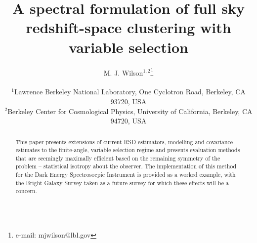 \documentclass[useAMS,usenatbib]{mn2e}
\title[Spectral RSD as an isotropic observable]{A spectral formulation of full sky redshift-space clustering with variable selection}
\author[M. J. Wilson]
{M. J. Wilson$^{1,2}$\thanks{e-mail: mjwilson@lbl.gov}
 \\~\\
\footnotesize
\footnotesize
$^1$Lawrence Berkeley National Laboratory, One Cyclotron Road, Berkeley, CA 93720, USA\\
$^2$Berkeley Center for Cosmological Physics, University of California, Berkeley, CA 94720, USA\\
}
\begin{document}
\maketitle 

\begin{abstract}
This paper presents extensions of current RSD estimators, modelling and covariance estimates to the finite-angle, variable selection regime and presents evaluation methods that are seemingly maximally efficient based on the remaining symmetry of the problem -- statistical isotropy about the observer.  The implementation of this method for the Dark Energy Spectrosocpic Instrument is provided as a worked example, with the Bright Galaxy Survey taken as a future survey for which these effects will be a concern.
\end{abstract}
\end{document}
